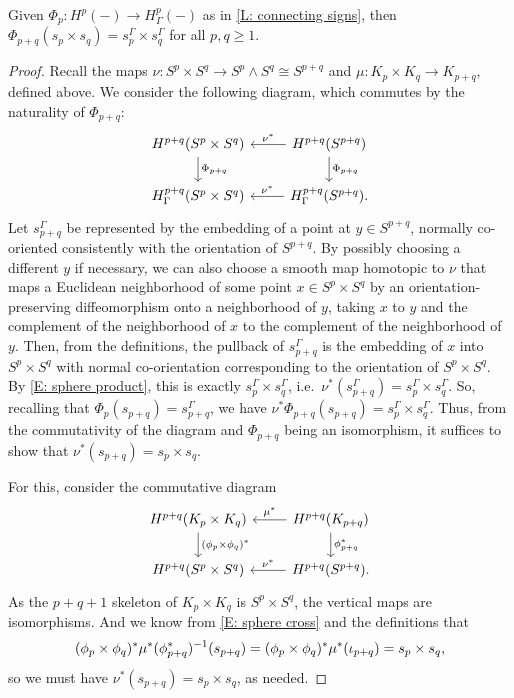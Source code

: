 \begin{corollary}\label{C: sphere product}
	Given $\Phi_p \colon H^p(-) \to H^p_\Gamma(-)$ as in \cref{L: connecting signs}, then $\Phi_{p+q}(s_p \times s_q) = s_p^\Gamma \times s_q^\Gamma$ for all $p,q \geq 1$.
\end{corollary}

\begin{proof}
	Recall the maps $\nu \colon S^p \times S^q \to S^p \wedge S^q \cong S^{p+q}$ and $\mu \colon K_p \times K_q \to K_{p+q}$, defined above.
	We consider the following diagram, which commutes by the naturality of $\Phi_{p+q}$:
	\[
	\begin{tikzcd}
		H^{p+q}(S^p \times S^q) \arrow{d}{\Phi_{p+q}} &
		H^{p+q}(S^{p+q}) \arrow[l, "\nu^*"'] \arrow{d}{\Phi_{p+q}} \\
		H^{p+q}_\Gamma(S^p \times S^q) &
		H_\Gamma^{p+q}(S^{p+q}) \arrow[l, "\nu^*"'].
	\end{tikzcd}
	\]
	Let $s_{p+q}^\Gamma$ be represented by the embedding of a point at $y \in S^{p+q}$, normally co-oriented consistently with the orientation of $S^{p+q}$.
	By possibly choosing a different $y$ if necessary, we can also choose a smooth map homotopic to $\nu$ that maps a Euclidean neighborhood of some point $x \in S^p \times S^q$ by an orientation-preserving diffeomorphism onto a neighborhood of $y$, taking $x$ to $y$ and the complement of the neighborhood of $x$ to the complement of the neighborhood of $y$.
	Then, from the definitions, the pullback of $s_{p+q}^\Gamma$ is the embedding of $x$ into $S^p \times S^q$ with normal co-orientation corresponding to the orientation of $S^p \times S^q$.
	By \cref{E: sphere product}, this is exactly $s_p^\Gamma \times s_q^\Gamma$, i.e.\ $\nu^*(s_{p+q}^\Gamma) = s_p^\Gamma \times s_q^\Gamma$.
	So, recalling that $\Phi_p(s_{p+q}) = s_{p+q}^\Gamma$, we have $\nu^*\Phi_{p+q}(s_{p+q}) = s_p^\Gamma \times s_q^\Gamma$.
	Thus, from the commutativity of the diagram and $\Phi_{p+q}$ being an isomorphism, it suffices to show that $\nu^*(s_{p+q}) = s_p \times s_q$.

	For this, consider the commutative diagram
	\[
	\begin{tikzcd}
		H^{p+q}(K_p \times K_q) \arrow[d, "(\phi_p \times \phi_q)^*"] &
		\arrow[l, "\mu^*"'] H^{p+q}(K_{p+q}) \arrow[d, "\phi_{p+q}^*"] \\
		H^{p+q}(S^p \times S^q) & \arrow[l, "\nu^*"'] H^{p+q}(S^{p+q}).
	\end{tikzcd}
	\]
	As the $p+q+1$ skeleton of $K_p \times K_q$ is $S^p \times S^q$, the vertical maps are isomorphisms.
	And we know from \eqref{E: sphere cross} and the definitions that
	$$(\phi_p \times \phi_q)^*\mu^*(\phi_{p+q}^*)^{-1}(s_{p+q}) = (\phi_p \times \phi_q)^*\mu^*(\iota_{p+q})\\
	= s_p \times s_q,$$
	so we must have $\nu^*(s_{p+q}) = s_p \times s_q$, as needed.
\end{proof}


